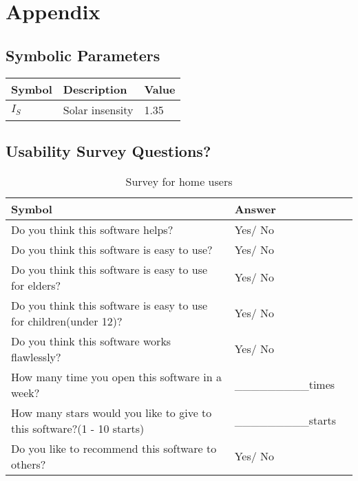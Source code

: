 \documentclass[12pt, titlepage]{article}
\begin{document}
\newpage


 
%


\newpage

\section{Appendix}


\subsection{Symbolic Parameters}

  \noindent \begin{tabular}{l l l} 
    \toprule		
    \textbf{Symbol} & \textbf{Description} & \textbf{Value}\\
    \midrule 
    $I_{S}$ & Solar insensity &1.35  \\
    \bottomrule
  \end{tabular}


 \subsection{Usability Survey Questions?}


\begin{table}[h!]
  \noindent \begin{tabular}{l l l} 
    \toprule		
    \textbf{Symbol} & \textbf{Answer} \\
    \midrule 
    Do you think this software helps? & Yes/ No  \\
    Do you think this software is easy to use? & Yes/ No  \\
    Do you think this software is easy to use for elders? & Yes/ No  \\
    Do you think this software is easy to use for children(under 12)? & Yes/ No  \\
    Do you think this software works flawlessly? & Yes/ No  \\
    How many time you open this software in a week? & \_\_\_\_\_\_\_\_\_times  \\
	 How many stars  would you like to give to this software?(1 - 10 starts) & \_\_\_\_\_\_\_\_\_starts  \\
    Do you like to recommend  this software to others? & Yes/ No  \\
    \bottomrule
  \end{tabular}
  \caption{Survey for home users}
\end{table}
\end{document}
